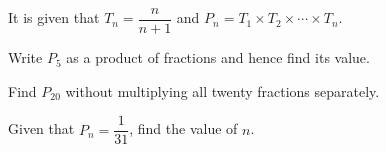  It is given that $T_n=\dfrac{n}{n+1}$ and $P_n=T_1\times T_2\times\cdots\times T_n$.

\begin{subparts}
  \item Write $P_5$ as a product of fractions and hence find its value.
  \item Find $P_{20}$ without multiplying all twenty fractions separately.
  \item Given that $P_n=\dfrac{1}{31}$, find the value of $n$.
\end{subparts}

